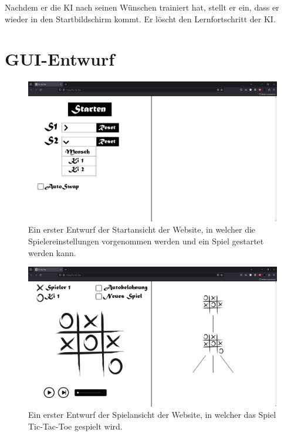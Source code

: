 \documentclass[titlepage]{scrartcl}
\begin{document}
Nachdem er die KI nach seinen Wünschen trainiert hat, stellt er ein, dass er wieder in den Startbildschirm kommt.
Er löscht den Lernfortschritt der KI.

\section{GUI-Entwurf}
\begin{figure}[ht]
\includegraphics[width=\textwidth]{tictactoe_startansicht.png}
\caption{Ein erster Entwurf der Startansicht der Website, in welcher die Spielereinstellungen vorgenommen werden und ein Spiel gestartet werden kann.}
\end{figure}

\begin{figure}[ht]
\includegraphics[width=\textwidth]{tictactoe_spielansicht.png}
\caption{Ein erster Entwurf der Spielansicht der Website, in welcher das Spiel Tic-Tac-Toe gespielt wird.}
\end{figure}
\end{document}
